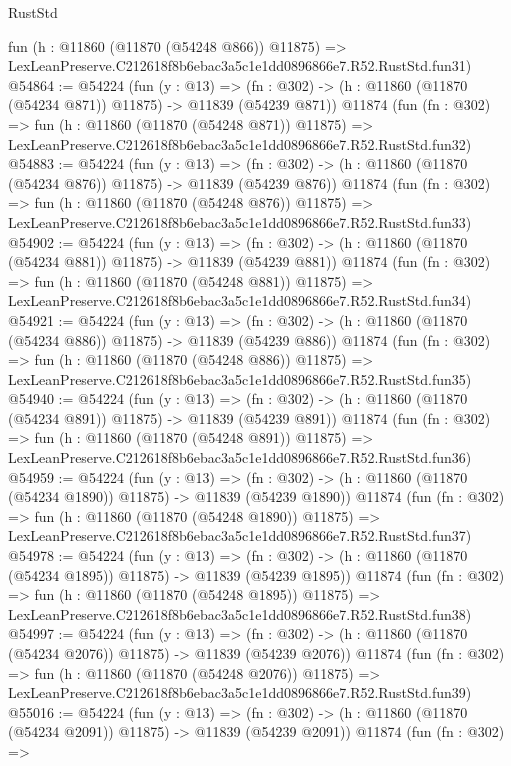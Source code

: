 \begin{lexlean}{RustStd}
\begin{coremodule}
    fun (h : @11860 (@11870 (@54248 @866)) @11875) =>
    LexLeanPreserve.C212618f8b6ebac3a5c1e1dd0896866e7.R52.RustStd.fun31)
@54864 := @54224
    (fun (y : @13) =>
    (fn : @302) -> (h : @11860 (@11870 (@54234 @871)) @11875) -> @11839 (@54239 @871))
    @11874
    (fun (fn : @302) =>
    fun (h : @11860 (@11870 (@54248 @871)) @11875) =>
    LexLeanPreserve.C212618f8b6ebac3a5c1e1dd0896866e7.R52.RustStd.fun32)
@54883 := @54224
    (fun (y : @13) =>
    (fn : @302) -> (h : @11860 (@11870 (@54234 @876)) @11875) -> @11839 (@54239 @876))
    @11874
    (fun (fn : @302) =>
    fun (h : @11860 (@11870 (@54248 @876)) @11875) =>
    LexLeanPreserve.C212618f8b6ebac3a5c1e1dd0896866e7.R52.RustStd.fun33)
@54902 := @54224
    (fun (y : @13) =>
    (fn : @302) -> (h : @11860 (@11870 (@54234 @881)) @11875) -> @11839 (@54239 @881))
    @11874
    (fun (fn : @302) =>
    fun (h : @11860 (@11870 (@54248 @881)) @11875) =>
    LexLeanPreserve.C212618f8b6ebac3a5c1e1dd0896866e7.R52.RustStd.fun34)
@54921 := @54224
    (fun (y : @13) =>
    (fn : @302) -> (h : @11860 (@11870 (@54234 @886)) @11875) -> @11839 (@54239 @886))
    @11874
    (fun (fn : @302) =>
    fun (h : @11860 (@11870 (@54248 @886)) @11875) =>
    LexLeanPreserve.C212618f8b6ebac3a5c1e1dd0896866e7.R52.RustStd.fun35)
@54940 := @54224
    (fun (y : @13) =>
    (fn : @302) -> (h : @11860 (@11870 (@54234 @891)) @11875) -> @11839 (@54239 @891))
    @11874
    (fun (fn : @302) =>
    fun (h : @11860 (@11870 (@54248 @891)) @11875) =>
    LexLeanPreserve.C212618f8b6ebac3a5c1e1dd0896866e7.R52.RustStd.fun36)
@54959 := @54224
    (fun (y : @13) =>
    (fn : @302) -> (h : @11860 (@11870 (@54234 @1890)) @11875) -> @11839 (@54239 @1890))
    @11874
    (fun (fn : @302) =>
    fun (h : @11860 (@11870 (@54248 @1890)) @11875) =>
    LexLeanPreserve.C212618f8b6ebac3a5c1e1dd0896866e7.R52.RustStd.fun37)
@54978 := @54224
    (fun (y : @13) =>
    (fn : @302) -> (h : @11860 (@11870 (@54234 @1895)) @11875) -> @11839 (@54239 @1895))
    @11874
    (fun (fn : @302) =>
    fun (h : @11860 (@11870 (@54248 @1895)) @11875) =>
    LexLeanPreserve.C212618f8b6ebac3a5c1e1dd0896866e7.R52.RustStd.fun38)
@54997 := @54224
    (fun (y : @13) =>
    (fn : @302) -> (h : @11860 (@11870 (@54234 @2076)) @11875) -> @11839 (@54239 @2076))
    @11874
    (fun (fn : @302) =>
    fun (h : @11860 (@11870 (@54248 @2076)) @11875) =>
    LexLeanPreserve.C212618f8b6ebac3a5c1e1dd0896866e7.R52.RustStd.fun39)
@55016 := @54224
    (fun (y : @13) =>
    (fn : @302) -> (h : @11860 (@11870 (@54234 @2091)) @11875) -> @11839 (@54239 @2091))
    @11874
    (fun (fn : @302) =>

\end{coremodule}
\end{lexlean}
